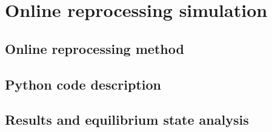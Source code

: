 \chapter[Online reprocessing simulation]{Online reprocessing simulation}

\section{Online reprocessing method}

\section{Python code description}

\section{Results and equilibrium state analysis}